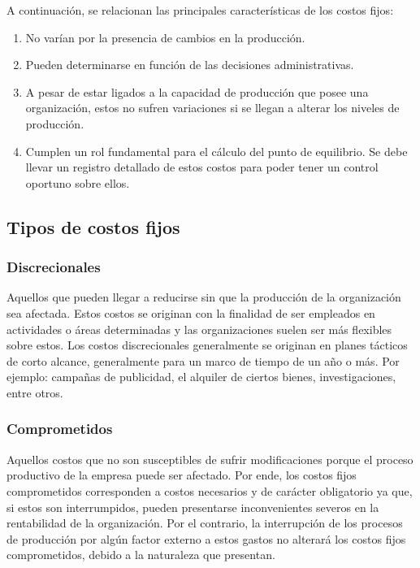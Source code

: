 \documentclass[../main]{subfiles}
\begin{document}
A continuación, se relacionan las principales características de
los costos fijos:
\begin{enumerate}
  \item No varían por la presencia de cambios en la producción.
  \item Pueden determinarse en función de las decisiones administrativas.
  \item A pesar de estar ligados a la capacidad de producción que
    posee una organización, estos no sufren variaciones si se llegan
    a alterar los niveles de producción.
  \item Cumplen un rol fundamental para el cálculo del punto de equilibrio.
    Se debe llevar un registro detallado de estos costos para poder
    tener un control oportuno sobre ellos.
\end{enumerate}
\begin{center}
\end{center}
\subsection{Tipos de costos fijos}
\subsubsection{Discrecionales}
Aquellos que pueden llegar a reducirse sin que la producción de la
organización sea afectada. Estos costos se originan con la finalidad
de ser empleados en actividades o áreas determinadas y las
organizaciones suelen ser más flexibles sobre estos. Los costos
discrecionales generalmente se originan en planes tácticos de
corto alcance, generalmente para un marco de tiempo de un año o más.
Por ejemplo: campañas de publicidad, el alquiler de ciertos
 bienes, investigaciones, entre otros.
\subsubsection{Comprometidos}
Aquellos costos que no son susceptibles de sufrir modificaciones
porque el proceso productivo de la empresa puede ser afectado. Por
ende, los costos fijos comprometidos corresponden a costos necesarios
y de carácter obligatorio ya que, si estos son interrumpidos, pueden
presentarse inconvenientes severos en la rentabilidad de la
organización. Por el contrario, la interrupción de los procesos de
producción por algún factor externo a estos gastos no alterará
los costos fijos comprometidos, debido a la naturaleza que presentan.
\end{document}
